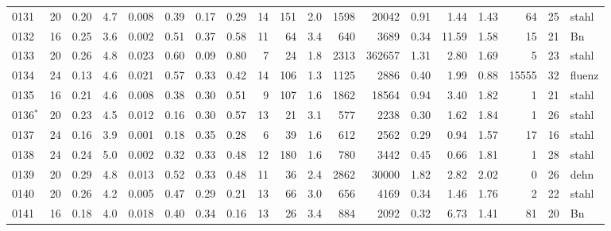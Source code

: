 {\begin{longtable}{@{}lrrrrrrrrrrrrrrrrrl@{}}
0131 & 20 & \num{0.20} & \num{4.7} & \num{0.008} & \num{0.39} & \num{0.17} & \num{0.29} & 14 & \num{151} & \num{2.0} & \num{1598} & \num{20042} & \num{0.91} & \num{1.44} & \num{1.43} & \num{64} & \num{25} & stahl \\
0132 & 16 & \num{0.25} & \num{3.6} & \num{0.002} & \num{0.51} & \num{0.37} & \num{0.58} & 11 & \num{64} & \num{3.4} & \num{640} & \num{3689} & \num{0.34} & \num{11.59} & \num{1.58} & \num{15} & \num{21} & Bn \\
0133 & 20 & \num{0.26} & \num{4.8} & \num{0.023} & \num{0.60} & \num{0.09} & \num{0.80} & 7 & \num{24} & \num{1.8} & \num{2313} & \num{362657} & \num{1.31} & \num{2.80} & \num{1.69} & \num{5} & \num{23} & stahl \\
0134 & 24 & \num{0.13} & \num{4.6} & \num{0.021} & \num{0.57} & \num{0.33} & \num{0.42} & 14 & \num{106} & \num{1.3} & \num{1125} & \num{2886} & \num{0.40} & \num{1.99} & \num{0.88} & \num{15555} & \num{32} & fluenz \\
0135 & 16 & \num{0.21} & \num{4.6} & \num{0.008} & \num{0.38} & \num{0.30} & \num{0.51} & 9 & \num{107} & \num{1.6} & \num{1862} & \num{18564} & \num{0.94} & \num{3.40} & \num{1.82} & \num{1} & \num{21} & stahl \\
0136$^\ast$ & 20 & \num{0.23} & \num{4.5} & \num{0.012} & \num{0.16} & \num{0.30} & \num{0.57} & 13 & \num{21} & \num{3.1} & \num{577} & \num{2238} & \num{0.30} & \num{1.62} & \num{1.84} & \num{1} & \num{26} & stahl \\
0137 & 24 & \num{0.16} & \num{3.9} & \num{0.001} & \num{0.18} & \num{0.35} & \num{0.28} & 6 & \num{39} & \num{1.6} & \num{612} & \num{2562} & \num{0.29} & \num{0.94} & \num{1.57} & \num{17} & \num{16} & stahl \\
0138 & 24 & \num{0.24} & \num{5.0} & \num{0.002} & \num{0.32} & \num{0.33} & \num{0.48} & 12 & \num{180} & \num{1.6} & \num{780} & \num{3442} & \num{0.45} & \num{0.66} & \num{1.81} & \num{1} & \num{28} & stahl \\
0139 & 20 & \num{0.29} & \num{4.8} & \num{0.013} & \num{0.52} & \num{0.33} & \num{0.48} & 11 & \num{36} & \num{2.4} & \num{2862} & \num{30000} & \num{1.82} & \num{2.82} & \num{2.02} & \num{0} & \num{26} & dehn \\
0140 & 20 & \num{0.26} & \num{4.2} & \num{0.005} & \num{0.47} & \num{0.29} & \num{0.21} & 13 & \num{66} & \num{3.0} & \num{656} & \num{4169} & \num{0.34} & \num{1.46} & \num{1.76} & \num{2} & \num{22} & stahl \\
0141 & 16 & \num{0.18} & \num{4.0} & \num{0.018} & \num{0.40} & \num{0.34} & \num{0.16} & 13 & \num{26} & \num{3.4} & \num{884} & \num{2092} & \num{0.32} & \num{6.73} & \num{1.41} & \num{81} & \num{20} & Bn \\

\end{longtable}}
